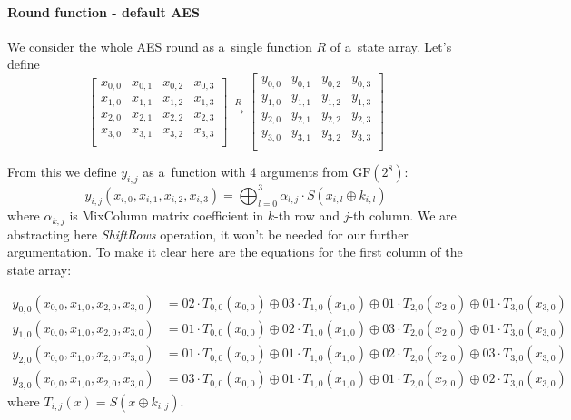 \documentclass[11pt,oneside,final]{fithesis2}
\newcommand{\gfe}{\ensuremath{\text{GF}\left(2^8\right)}}
\begin{document}
	\paragraph*{Round function - default AES}
	We consider the whole AES round as a~single function $R$ of a~state array. Let's define
	\[
	\begin{bmatrix} 
	    x_{0,0} & x_{0,1} & x_{0,2} & x_{0,3}\\
	    x_{1,0} & x_{1,1} & x_{1,2} & x_{1,3}\\
	    x_{2,0} & x_{2,1} & x_{2,2} & x_{2,3}\\
	    x_{3,0} & x_{3,1} & x_{3,2} & x_{3,3}\\
	\end{bmatrix} 
	\overset{R}{\longrightarrow}
	\begin{bmatrix} 
	    y_{0,0} & y_{0,1} & y_{0,2} & y_{0,3}\\
	    y_{1,0} & y_{1,1} & y_{1,2} & y_{1,3}\\
	    y_{2,0} & y_{2,1} & y_{2,2} & y_{2,3}\\
	    y_{3,0} & y_{3,1} & y_{3,2} & y_{3,3}\\
	\end{bmatrix} 
	\]

	From this we define $y_{i,j}$ as a~function with 4 arguments from $\gfe$:
	\begin{equation}
	y_{i,j}\left(x_{i,0}, x_{i,1}, x_{i,2}, x_{i,3}\right) = \bigoplus^3_{l=0} \alpha_{l,j} \cdot S(x_{i,l} \oplus k_{i,l})
	\end{equation}
	where $\alpha_{k,j}$ is MixColumn matrix coefficient in $k$-th row and $j$-th column. We are abstracting here \emph{ShiftRows} operation, it won't be needed for our further argumentation.
	To make it clear here are the equations for the first column of the state array:

	{\footnotesize
	\begin{subequations}
	\begin{align}
	y_{0,0}\left(x_{0,0}, x_{1,0}, x_{2,0}, x_{3,0}\right) &= 02 \cdot T_{0,0}(x_{0,0}) \oplus 03 \cdot T_{1,0}(x_{1,0})\oplus 01 \cdot T_{2,0}(x_{2,0})\oplus 01 \cdot T_{3,0}(x_{3,0})\\
	y_{1,0}\left(x_{0,0}, x_{1,0}, x_{2,0}, x_{3,0}\right) &= 01 \cdot T_{0,0}(x_{0,0}) \oplus 02 \cdot T_{1,0}(x_{1,0})\oplus 03 \cdot T_{2,0}(x_{2,0})\oplus 01 \cdot T_{3,0}(x_{3,0})\\
	y_{2,0}\left(x_{0,0}, x_{1,0}, x_{2,0}, x_{3,0}\right) &= 01 \cdot T_{0,0}(x_{0,0}) \oplus 01 \cdot T_{1,0}(x_{1,0})\oplus 02 \cdot T_{2,0}(x_{2,0})\oplus 03 \cdot T_{3,0}(x_{3,0})\\
	y_{3,0}\left(x_{0,0}, x_{1,0}, x_{2,0}, x_{3,0}\right) &= 03 \cdot T_{0,0}(x_{0,0}) \oplus 01 \cdot T_{1,0}(x_{1,0})\oplus 01 \cdot T_{2,0}(x_{2,0})\oplus 02 \cdot T_{3,0}(x_{3,0})
	\end{align}
	\end{subequations}}
	where $T_{i,j}(x) = S\left(x \oplus k_{i,j}\right)$.
\end{document}
